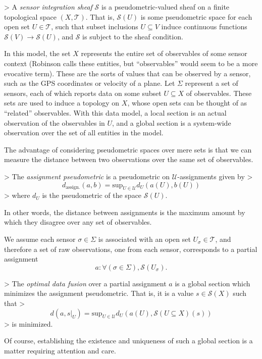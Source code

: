 \begin{definition}
>   A \emph{sensor integration sheaf} $\mathcal{S}$ is a pseudometric-valued sheaf on a finite topological space $(X, \mathcal{T})$. That is, $\mathcal{S}(U)$ is some pseudometric space for each open set $U \in \mathcal{T}$, such that subset inclusions $U \subseteq V$ induce continuous functions $\mathcal{S}(V) \to \mathcal{S}(U)$, and $\mathcal{S}$ is subject to the sheaf condition.
\end{definition}
In this model, the set $X$ represents the entire set of observables of some sensor context (Robinson calls these entities, but ``observables'' would seem to be a more evocative term). These are the sorts of values that can be observed by a sensor, such as the GPS coordinates or velocity of a plane. Let $\Sigma$ represent a set of sensors, each of which reports data on some subset $U \subseteq X$ of observables. These sets are used to induce a topology on $X$, whose open sets can be thought of as ``related'' observables. With this data model, a local section is an actual observation of the observables in $U$, and a global section is a system-wide observation over the set of all entities in the model.

The advantage of considering pseudometric spaces over mere sets is that we can measure the distance between two observations over the same set of observables.

\begin{definition}
>   The \emph{assignment pseudometric} is a pseudometric on $\mathcal{U}$-assignments given by
>   \[ d_\textrm{assign.} (a, b) = \mathrm{sup}_{U \in \mathcal{U}} d_U(a(U), b(U))\]
>   where $d_U$ is the pseudometric of the space $\mathcal{S}(U)$.
\end{definition}

In other words, the distance between assignments is the maximum amount by which they disagree over any set of observables.

We assume each sensor $\sigma \in \Sigma$ is associated with an open set $U_\sigma \in \mathcal{T}$, and therefore a set of raw observations, one from each sensor, corresponds to a partial assignment
\[ a : \forall (\sigma \in \Sigma), \mathcal{S}(U_\sigma).\]

\begin{definition}
>   The \emph{optimal data fusion} over a partial assignment $a$ is a global section which minimizes the assignment pseudometric. That is, it is a value $s \in \mathcal{S}(X)$ such that
>   \[ d(a, s|_U) = \mathrm{sup}_{U \in \mathcal{U}} d_U(a(U), \mathcal{S}(U \subseteq X)(s))\]
>   is minimized.
\end{definition}
Of course, establishing the existence and uniqueness of such a global section is a matter requiring attention and care.

